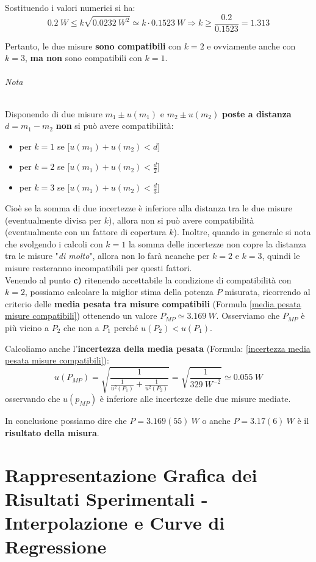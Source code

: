 \documentclass[a4paper,11pt]{report}
\begin{document}
Sostituendo i valori numerici si ha:
$$
  0.2~W \le k\sqrt{0.0232~W^2} \simeq k\cdot0.1523~W \Rightarrow k \ge \frac{0.2}{0.1523} = 1.313
$$

Pertanto, le due misure \textbf{sono compatibili} con $k=2$ e ovviamente anche con $k=3$, \textbf{ma non} sono compatibili con $k=1$.
\subparagraph{Nota} Disponendo di due misure $m_1\pm u(m_1)$ e $m_2\pm u(m_2)$ \textbf{poste a distanza} $d = m_1 - m_2$ \textbf{non} si può avere compatibilità:
\begin{itemize}
  \item per $k=1$ se [$u(m_1)+u(m_2) < d$]
  \item per $k=2$ se [$u(m_1)+u(m_2) < \frac{d}{2}$]
  \item per $k=3$ se [$u(m_1)+u(m_2) < \frac{d}{3}$]
\end{itemize}
Cioè se la somma di due incertezze è inferiore alla distanza tra le due misure (eventualmente divisa per $k$), allora non si può avere compatibilità (eventualmente con un fattore di copertura $k$). Inoltre, quando in generale si nota che svolgendo i calcoli con $k = 1$ la somma delle incertezze non copre la distanza tra le misure "\textit{di molto}", allora non lo farà neanche per $k=2$ e $k=3$, quindi le misure resteranno incompatibili per questi fattori.
\\

Venendo al punto \textbf{c)} ritenendo accettabile la condizione di compatibilità con $k=2$, possiamo calcolare la miglior stima della potenza $P$ misurata, ricorrendo al criterio delle \textbf{media pesata tra misure compatibili} (Formula \ref{media pesata misure compatibili}) ottenendo un valore $P_{MP} \simeq 3.169~W$. Osserviamo che $P_{MP}$ è più vicino a $P_2$ che non a $P_1$ perché $u(P_2)<u(P_1)$.

Calcoliamo anche l'\textbf{incertezza della media pesata} (Formula: \ref{incertezza media pesata misure compatibili}):
$$
  u(P_{MP}) = \sqrt{\frac{1}{\frac{1}{u^2(P_1)}+\frac{1}{u^2(P_2)}}} = \sqrt{\frac{1}{329~W^{-2}}} \simeq 0.055~W
$$
osservando che $u(p_{MP})$ è inferiore alle incertezze delle due misure mediate.

In conclusione possiamo dire che $P = 3.169(55)~W$ o anche $P=3.17(6)~W$ è il \textbf{risultato della misura}.
\chapter{Rappresentazione Grafica dei Risultati Sperimentali - Interpolazione e Curve di Regressione}
\end{document}
